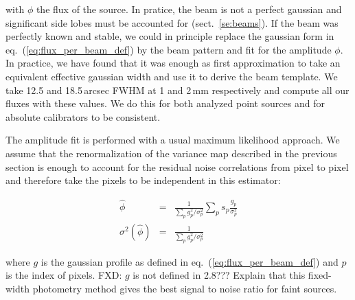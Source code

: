 with $\phi$ the flux of the source. In pratice, the beam is not a perfect
gaussian and significant side lobes must be accounted for
(sect.~\ref{se:beams}). If the beam was perfectly known and stable, we could in
principle replace the gaussian form in eq.~(\ref{eq:flux_per_beam_def}) by the
beam pattern and fit for the amplitude $\phi$. In practice, we have found that
it was enough as first approximation to take an equivalent effective gaussian
width and use it to derive the beam template. We take 12.5 and 18.5\,arcsec FWHM
at 1 and 2\,mm respectively and compute all our fluxes with these
values. We do this for both analyzed point sources and for absolute calibrators
to be consistent.

The amplitude fit is performed with a usual maximum likelihood
approach. We assume that the renormalization of the variance map described in
the previous section is enough to account for the residual noise correlations
from pixel to pixel and therefore take the pixels to be independent in this
estimator:

\begin{eqnarray}
\hat{\phi} &=& \frac{1}{\sum_p g_p^2/\sigma_p^2}\sum_p
s_p\frac{g_p}{\sigma_p^2} \label{eq:flux_estim_def} \\
\sigma^2(\hat{\phi}) &=& \frac{1}{\sum_p
  g_p^2/\sigma_p^2} \label{eq:flux_estim_var_def}
\end{eqnarray}

where $g$ is the gaussian profile as defined in eq.~(\ref{eq:flux_per_beam_def})
and $p$ is the index of pixels.
{\color{blue} FXD: $g$ is not defined in 2.8??? Explain that this fixed-width photometry method gives the best signal to noise ratio for faint sources.}



